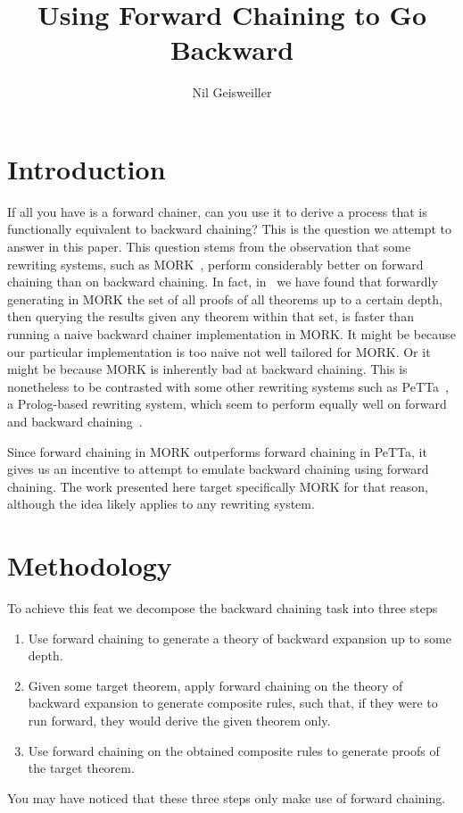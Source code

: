 \documentclass{easychair}
\title{Using Forward Chaining to Go Backward}
\author{Nil Geisweiller}
\institute{
  SingularityNET Foundation,\\
  Zug, Switzerland\\
  \email{nil@singularitynet.io}
}
\begin{document}
\maketitle


\section{Introduction}

If all you have is a forward chainer, can you use it to derive a
process that is functionally equivalent to backward chaining?  This is
the question we attempt to answer in this paper.  This question stems
from the observation that some rewriting systems, such as
MORK~\cite{NEXT}, perform considerably better on forward chaining than
on backward chaining.  In fact, in~\cite{NEXT} we have found that
forwardly generating in MORK the set of all proofs of all theorems up
to a certain depth, then querying the results given any theorem within
that set, is faster than running a naive backward chainer
implementation in MORK.  It might be because our particular
implementation is too naive not well tailored for MORK.  Or it might
be because MORK is inherently bad at backward chaining.  This is
nonetheless to be contrasted with some other rewriting systems such as
PeTTa~\cite{NEXT}, a Prolog-based rewriting system, which seem to
perform equally well on forward and backward chaining~\cite{NEXT}.

Since forward chaining in MORK outperforms forward chaining in PeTTa,
it gives us an incentive to attempt to emulate backward chaining using
forward chaining.  The work presented here target specifically MORK
for that reason, although the idea likely applies to any rewriting
system.

\section{Methodology}

To achieve this feat we decompose the backward chaining task into
three steps
\begin{enumerate}
\item Use forward chaining to generate a theory of backward expansion
  up to some depth.
\item Given some target theorem, apply forward chaining on the theory
  of backward expansion to generate composite rules, such that, if
  they were to run forward, they would derive the given theorem only.
\item Use forward chaining on the obtained composite rules to generate
  proofs of the target theorem.
\end{enumerate}
You may have noticed that these three steps only make use of forward
chaining.
\end{document}
